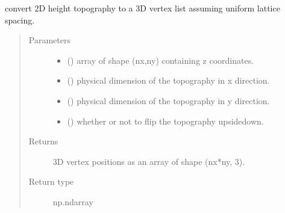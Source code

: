\documentclass[letterpaper,10pt,english]{sphinxmanual}
\begin{document}
\begin{fulllineitems}
\label{\detokenize{stlutils:stlutils.from_array}}
\sphinxAtStartPar
convert 2D height topography to a 3D vertex list assuming uniform lattice spacing.
\begin{quote}\begin{description}
\item[{Parameters}] \leavevmode\begin{itemize}
\item {} 
\sphinxAtStartPar
{} () \textendash{} array of shape (nx,ny) containing z coordinates.

\item {} 
\sphinxAtStartPar
{} () \textendash{} physical dimension of the topography in x direction.

\item {} 
\sphinxAtStartPar
{} () \textendash{} physical dimension of the topography in y direction.

\item {} 
\sphinxAtStartPar
{} () \textendash{} whether or not to flip the topography upside\sphinxhyphen{}down.

\end{itemize}

\item[{Returns}] \leavevmode
\sphinxAtStartPar
3D vertex positions as an array of shape (nx*ny, 3).

\item[{Return type}] \leavevmode
\sphinxAtStartPar
np.ndarray

\end{description}\end{quote}

\end{fulllineitems}
\end{document}
